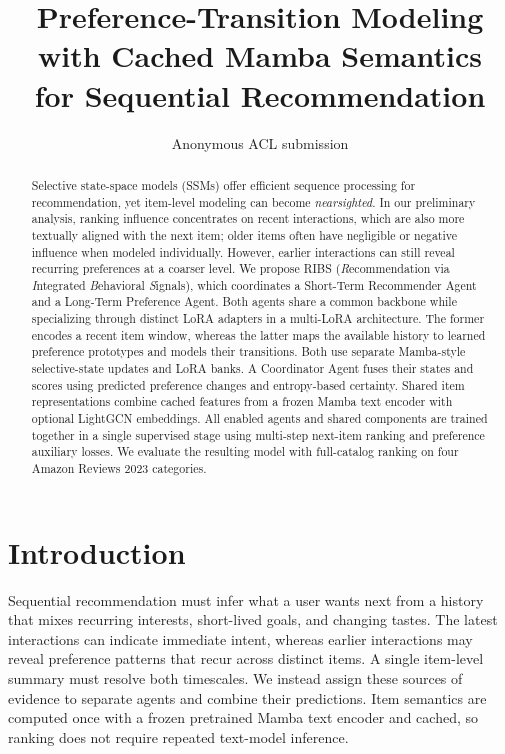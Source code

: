 \documentclass[11pt]{article}
\title{Preference-Transition Modeling with Cached Mamba Semantics\\for Sequential Recommendation}
\author{Anonymous ACL submission}
\begin{document}
\maketitle

\begin{abstract}
  Selective state-space models (SSMs) offer efficient sequence processing for recommendation, yet item-level modeling can become \emph{nearsighted}. In our preliminary analysis, ranking influence concentrates on recent interactions, which are also more textually aligned with the next item; older items often have negligible or negative influence when modeled individually. However, earlier interactions can still reveal recurring preferences at a coarser level. We propose RIBS (\emph{R}ecommendation via \emph{I}ntegrated \emph{B}ehavioral \emph{S}ignals), which coordinates a Short-Term Recommender Agent and a Long-Term Preference Agent. Both agents share a common backbone while specializing through distinct LoRA adapters in a multi-LoRA architecture. The former encodes a recent item window, whereas the latter maps the available history to learned preference prototypes and models their transitions. Both use separate Mamba-style selective-state updates and LoRA banks. A Coordinator Agent fuses their states and scores using predicted preference changes and entropy-based certainty. Shared item representations combine cached features from a frozen Mamba text encoder with optional LightGCN embeddings. All enabled agents and shared components are trained together in a single supervised stage using multi-step next-item ranking and preference auxiliary losses. We evaluate the resulting model with full-catalog ranking on four Amazon Reviews 2023 categories.
\end{abstract}

\section{Introduction}
Sequential recommendation must infer what a user wants next from a history that mixes recurring interests, short-lived goals, and changing tastes. The latest interactions can indicate immediate intent, whereas earlier interactions may reveal preference patterns that recur across distinct items. A single item-level summary must resolve both timescales. We instead assign these sources of evidence to separate agents and combine their predictions. Item semantics are computed once with a frozen pretrained Mamba text encoder \citep{Mamba} and cached, so ranking does not require repeated text-model inference.
\end{document}
